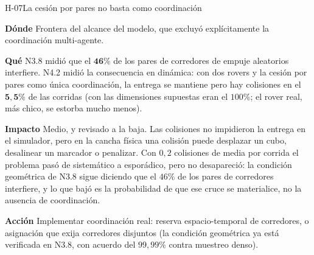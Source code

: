 \documentclass[11pt,a4paper]{article}
\newcommand{\campo}[1]{\par\smallskip\noindent\textbf{#1}\quad\ignorespaces}
\begin{document}
\begin{hallazgo}{H-07}{La cesión por pares no basta como coordinación}
\campo{Dónde} Frontera del alcance del modelo, que excluyó explícitamente la
coordinación multi-agente.
\campo{Qué} N3.8 midió que el $\mathbf{46\%}$ de los pares de corredores de empuje
aleatorios interfiere. N4.2 midió la consecuencia en dinámica: con dos rovers y la
cesión por pares como única coordinación, la entrega se mantiene pero hay colisiones en
el $\mathbf{5{,}5\%}$ de las corridas (con las dimensiones supuestas eran el $100\%$;
el rover real, más chico, se estorba mucho menos).
\campo{Impacto} Medio, y revisado a la baja. Las colisiones no impidieron la entrega en
el simulador, pero en la cancha física una colisión puede desplazar un cubo, desalinear
un marcador o penalizar. Con $0{,}2$ colisiones de media por corrida el problema pasó de
sistemático a esporádico, pero no desapareció: la condición geométrica de N3.8 sigue
diciendo que el $46\%$ de los pares de corredores interfiere, y lo que bajó es la
probabilidad de que ese cruce se materialice, no la ausencia de coordinación.
\campo{Acción} Implementar coordinación real: reserva espacio-temporal de corredores, o
asignación que exija corredores disjuntos (la condición geométrica ya está verificada en
N3.8, con acuerdo del $99{,}99\%$ contra muestreo denso).
\end{hallazgo}
\end{document}
